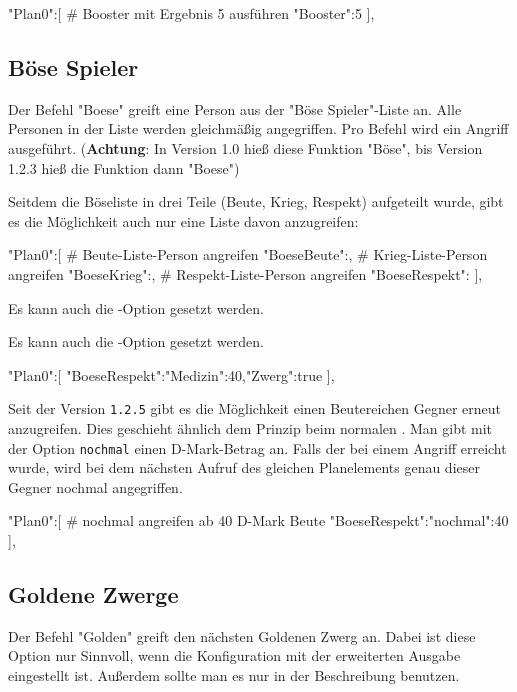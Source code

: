 \documentclass{scrartcl}
\begin{document}
\begin{code}[language=bash]
"Plan0":[
# Booster mit Ergebnis 5 ausführen
	{"Booster":5}
],
\end{code}


\subsection{Böse Spieler}
\label{Boese}
Der Befehl "Boese" greift eine Person aus der "Böse Spieler"-Liste an. Alle
Personen in der Liste werden gleichmäßig angegriffen. Pro Befehl wird ein
Angriff ausgeführt. (\textbf{Achtung}: In Version 1.0 hieß diese Funktion
"Böse", bis Version 1.2.3 hieß die Funktion dann "Boese")

Seitdem die Böseliste in drei Teile (Beute, Krieg, Respekt) aufgeteilt wurde,
gibt es die Möglichkeit auch nur eine Liste davon anzugreifen:

\begin{code}[language=bash]
"Plan0":[
# Beute-Liste-Person angreifen
	{"BoeseBeute":{}},
# Krieg-Liste-Person angreifen
	{"BoeseKrieg":{}},
# Respekt-Liste-Person angreifen
	{"BoeseRespekt":{}}
],
\end{code}

Es kann auch die -Option gesetzt werden.

Es kann auch die -Option gesetzt werden.

\begin{code}[language=bash]
"Plan0":[
	{"BoeseRespekt":{"Medizin":40,"Zwerg":true}}
],
\end{code}

Seit der Version \texttt{1.2.5} gibt es die Möglichkeit einen Beutereichen
Gegner erneut anzugreifen. Dies geschieht ähnlich dem Prinzip beim normalen
. Man gibt mit der Option \texttt{nochmal} einen D-Mark-Betrag
an. Falls der bei einem Angriff erreicht wurde, wird bei dem nächsten Aufruf des
gleichen Planelements genau dieser Gegner nochmal angegriffen.

\begin{code}[language=bash]
"Plan0":[
# nochmal angreifen ab 40 D-Mark Beute
	{"BoeseRespekt":{"nochmal":40}}
],
\end{code}

\subsection{Goldene Zwerge}
\label{Golden}
Der Befehl "Golden" greift den nächsten Goldenen Zwerg an. Dabei ist diese Option nur Sinnvoll, wenn die Konfiguration mit der erweiterten Ausgabe eingestellt ist. Außerdem sollte man es nur in der Beschreibung benutzen.
\end{document}
